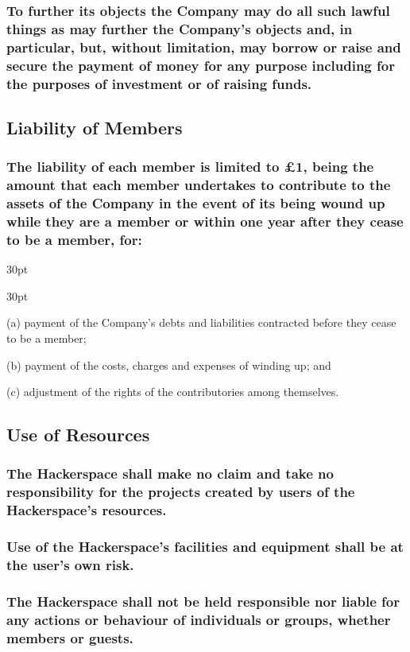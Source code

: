 \documentclass[12pt]{article}
\def\clauseindent{30pt}
\newenvironment{subindentlist}{\begin{adjustwidth}{\clauseindent}{}\begin{labeledlist}{\clauseindent}}{\end{labeledlist}\end{adjustwidth}}
\begin{document}
\subsubsection{To further its objects the Company may do all such lawful things as may further the Company’s objects and, in particular, but, without limitation, may borrow or raise and secure the payment of money for any purpose including for the purposes of investment or of raising funds.}

\subsection{Liability of Members}
\subsubsection{The liability of each member is limited to £1, being the amount that each member undertakes to contribute to the assets of the Company in the event of its being wound up while they are a member or within one year after they cease to be a member, for:}
\begin{subindentlist}
  \item [(a)] payment of the Company’s debts and liabilities contracted before they cease to be a member;
  \item [(b)] payment of the costs, charges and expenses of winding up; and
  \item [(c)] adjustment of the rights of the contributories among themselves.
\end{subindentlist}

\subsection{Use of Resources}
\subsubsection{The Hackerspace shall make no claim and take no responsibility for the projects created by users of the Hackerspace's resources.}
\subsubsection{Use of the Hackerspace's facilities and equipment shall be at the user's own risk.}
\subsubsection{The Hackerspace shall not be held responsible nor liable for any actions or behaviour of individuals or groups, whether members or guests.}
\end{document}
